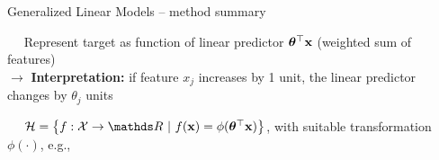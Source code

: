 \begin{vbframe}{Generalized Linear Models -- method summary}

   
 
\medskip

 ~~ Represent target as function of linear predictor
$\bm{\theta}^\top \mathbf{x}$ (weighted sum of features)\\
$\rightarrow$ \textbf{Interpretation:} if feature $x_j$ increases by 1 unit, the linear predictor changes by $\theta_j$ units


\medskip

 ~~
$\Hspace = \left\{f: \Xspace \to \R ~|~\fx = \phi(\thetab^\top \xv)\right\}$, 
with suitable transformation $\phi(\cdot)$, e.g.,


\end{vbframe}
